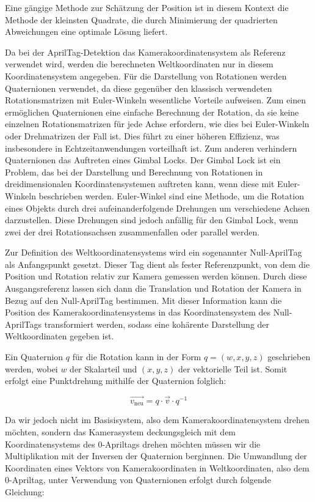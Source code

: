 \documentclass[ngerman]{article}    %
\theoremstyle{definition}
\begin{document}
Eine gängige Methode zur Schätzung der Position ist in diesem Kontext die Methode der kleinsten Quadrate, die durch Minimierung der quadrierten Abweichungen eine optimale Lösung liefert.

Da bei der AprilTag-Detektion das Kamerakoordinatensystem als Referenz verwendet wird, werden die berechneten Weltkoordinaten nur in diesem Koordinatensystem angegeben. Für die Darstellung von Rotationen werden Quaternionen verwendet, da diese gegenüber den klassisch verwendeten Rotationsmatrizen mit Euler-Winkeln wesentliche Vorteile aufweisen. Zum einen ermöglichen Quaternionen eine einfache Berechnung der Rotation, da sie keine einzelnen Rotationsmatrizen für jede Achse erfordern, wie dies bei Euler-Winkeln oder Drehmatrizen der Fall ist. Dies führt zu einer höheren Effizienz, was insbesondere in Echtzeitanwendungen vorteilhaft ist. Zum anderen verhindern Quaternionen das Auftreten eines Gimbal Locks. Der Gimbal Lock ist ein Problem, das bei der Darstellung und Berechnung von Rotationen in dreidimensionalen Koordinatensystemen auftreten kann, wenn diese mit Euler-Winkeln beschrieben werden. Euler-Winkel sind eine Methode, um die Rotation eines Objekts durch drei aufeinanderfolgende Drehungen um verschiedene Achsen darzustellen. Diese Drehungen sind jedoch anfällig für den Gimbal Lock, wenn zwei der drei Rotationsachsen zusammenfallen oder parallel werden.

Zur Definition des Weltkoordinatensystems wird ein sogenannter Null-AprilTag als Anfangspunkt gesetzt. Dieser Tag dient als fester Referenzpunkt, von dem die Position und Rotation relativ zur Kamera gemessen werden können. Durch diese Ausgangsreferenz lassen sich dann die Translation und Rotation der Kamera in Bezug auf den Null-AprilTag bestimmen. Mit dieser Information kann die Position des Kamerakoordinatensystems in das Koordinatensystem des Null-AprilTags transformiert werden, sodass eine kohärente Darstellung der Weltkoordinaten gegeben ist.

Ein Quaternion \( q \) für die Rotation kann in der Form \( q = (w, x, y, z) \) geschrieben werden, wobei \( w \) der Skalarteil und \( (x, y, z) \) der vektorielle Teil ist. Somit erfolgt eine Punktdrehung mithilfe der Quaternion folglich:

\begin{equation}
    \vec{v_\text{neu}} = q \cdot \vec{v} \cdot q^{-1}
\end{equation}

Da wir jedoch nicht im Basisisystem, also dem Kamerakoordinatensystem drehen möchten, sondern das Kamerasystem deckungsgleich mit dem Koordinatensystems des 0-Apriltags drehen möchten müssen wir die Multiplikation mit der Inversen der Quaternion berginnen. Die Umwandlung der Koordinaten eines Vektors von Kamerakoordinaten in Weltkoordinaten, also dem 0-Apriltag, unter Verwendung von Quaternionen erfolgt durch folgende Gleichung:
\end{document}
